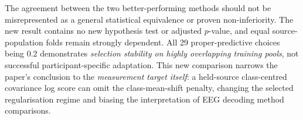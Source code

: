 The agreement between the two better-performing methods
should not be misrepresented as a general statistical
equivalence or proven non-inferiority. The new result
contains no new hypothesis test or adjusted $p$-value,
and equal source-population folds remain strongly dependent.
All 29 proper-predictive choices being 0.2 demonstrates
\emph{selection stability on highly overlapping training pools},
not successful participant-specific adaptation.
This new comparison narrows the paper's conclusion to
the \emph{measurement target itself}: a held-source
class-centred covariance log score can omit the
class-mean-shift penalty, changing the selected
regularisation regime and biasing the interpretation
of EEG decoding method comparisons.
